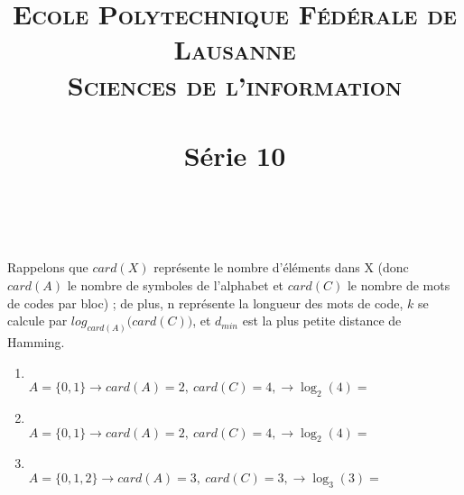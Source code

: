 \documentclass[10p,a4paper]{scrartcl}
\title{	
\normalfont \normalsize 
\textsc{Ecole Polytechnique Fédérale de Lausanne} \\ [25pt] %
\textsc{Sciences de l'information}\\ [0pt] %
\horrule{0.5pt} \\[0.4cm] %
\huge Série 10 \\ %
\horrule{2pt} \\[0.5cm] %
}
\date{}
\renewcommand{\(}{\left(}
\renewcommand{\)}{\right)}
\begin{document}
\maketitle
\setcounter{section}{10}
\subsection{}
Rappelons que $card(X)$ représente le nombre d'éléments dans X (donc $card(A)$ le nombre de symboles de l'alphabet et $card(C)$ le nombre de mots de codes par bloc) ; de plus, n représente la longueur des mots de code, $k$ se calcule par $log_{card(A)}\big(card(C)\big)$, et $d_{min}$ est la plus petite distance de Hamming.
\begin{enumerate}
	\item	{}\\
			$A = \{0,1\} \to card(A) = 2,\ card(C) = 4, \to \log_2(4) =$  \\
			
	\item	{}\\
			$A = \{0,1\} \to card(A) = 2,\ card(C) = 4, \to  \log_2(4) =$ \\
			
	\item	{}\\
			$A = \{0,1,2\} \to card(A) = 3,\ card(C) = 3, \to \log_3(3) =$ \\
\end{enumerate}
\end{document}
